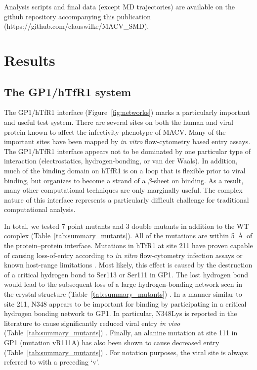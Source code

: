 \documentclass[12pt]{article}
\begin{document}
Analysis scripts and final data (except MD trajectories) are available on the github repository accompanying this publication (https://github.com/clauswilke/MACV\_SMD).

\section{Results}

\subsection{The GP1/hTfR1 system}
The GP1/hTfR1 interface (Figure~\ref{fig:networks}) marks a particularly important and useful test system. There are several sites on both the human and viral protein known to affect the infectivity phenotype of MACV. Many of the important sites have been mapped by \textit{in vitro} flow-cytometry based entry assays. The GP1/hTfR1 interface appears not to be dominated by one particular type of interaction (electrostatics, hydrogen-bonding, or van der Waals). In addition, much of the binding domain on hTfR1 is on a loop that is flexible prior to viral binding, but organizes to become a strand of a $\beta$-sheet on binding. As a result,  many other computational techniques \citep{Grant2011,Kortemme2004} are only marginally useful. The complex nature of this interface represents a particularly difficult challenge for traditional computational analysis. 

In total, we tested 7 point mutants and 3 double mutants in addition to the WT complex (Table~\ref{tab:summary_mutants}). All of the mutations are within 5~\AA\ of the protein--protein interface. Mutations in hTfR1 at site 211 have proven capable of causing loss-of-entry according to \textit{in vitro} flow-cytometry infection assays or known host-range limitations \citep{Rad2008,Rad20111,Rad20112}. Most likely, this effect is caused by the destruction of a critical hydrogen bond to Ser113 or Ser111 in GP1. The lost hydrogen bond would lead to the subsequent loss of a large hydrogen-bonding network seen in the crystal structure (Table~\ref{tab:summary_mutants}) \citep{Abraham2010}. In a manner similar to site 211, N348 appears to be important for binding by participating in a critical hydrogen bonding network \citep{Rad2008,Abraham2010} to GP1. In particular, N348Lys is reported in the literature to cause significantly reduced viral entry \textit{in vivo} (Table~\ref{tab:summary_mutants}) \citep{Rad2008,Abraham2010}. Finally, an alanine mutation at site 111 in GP1 (mutation vR111A) has also been shown to cause decreased entry (Table~\ref{tab:summary_mutants}) \citep{Rad20112}. For notation purposes, the viral site is always referred to with a preceding `v'.  
\end{document}
